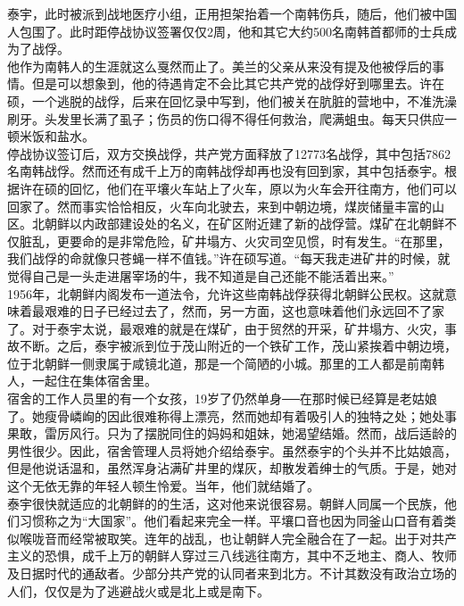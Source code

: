 泰宇，此时被派到战地医疗小组，正用担架抬着一个南韩伤兵，随后，他们被中国人包围了。此时距停战协议签署仅仅2周，他和其它大约500名南韩首都师的士兵成为了战俘。\\

他作为南韩人的生涯就这么戛然而止了。美兰的父亲从来没有提及他被俘后的事情。但是可以想象到，他的待遇肯定不会比其它共产党的战俘好到哪里去。许在硕，一个逃脱的战俘，后来在回忆录中写到，他们被关在肮脏的营地中，不准洗澡刷牙。头发里长满了虱子；伤员的伤口得不得任何救治，爬满蛆虫。每天只供应一顿米饭和盐水。\\

停战协议签订后，双方交换战俘，共产党方面释放了12773名战俘，其中包括7862名南韩战俘。然而还有成千上万的南韩战俘却再也没有回到家，其中包括泰宇。根据许在硕的回忆，他们在平壤火车站上了火车，原以为火车会开往南方，他们可以回家了。然而事实恰恰相反，火车向北驶去，来到中朝边境，煤炭储量丰富的山区。北朝鲜以内政部建设处的名义，在矿区附近建了新的战俘营。煤矿在北朝鲜不仅脏乱，更要命的是非常危险，矿井塌方、火灾司空见惯，时有发生。“在那里，我们战俘的命就像只苍蝇一样不值钱。”许在硕写道。“每天我走进矿井的时候，就觉得自己是一头走进屠宰场的牛，我不知道是自己还能不能活着出来。”\\

1956年，北朝鲜内阁发布一道法令，允许这些南韩战俘获得北朝鲜公民权。这就意味着最艰难的日子已经过去了，然而，另一方面，这也意味着他们永远回不了家了。对于泰宇太说，最艰难的就是在煤矿，由于贸然的开采，矿井塌方、火灾，事故不断。之后，泰宇被派到位于茂山附近的一个铁矿工作，茂山紧挨着中朝边境，位于北朝鲜一侧隶属于咸镜北道，那是一个简陋的小城。那里的工人都是前南韩人，一起住在集体宿舍里。\\

宿舍的工作人员里的有一个女孩，19岁了仍然单身──在那时候已经算是老姑娘了。她瘦骨嶙峋的因此很难称得上漂亮，然而她却有着吸引人的独特之处；她处事果敢，雷厉风行。只为了摆脱同住的妈妈和姐妹，她渴望结婚。然而，战后适龄的男性很少。因此，宿舍管理人员将她介绍给泰宇。虽然泰宇的个头并不比姑娘高，但是他说话温和，虽然浑身沾满矿井里的煤灰，却散发着绅士的气质。于是，她对这个无依无靠的年轻人顿生怜爱。当年，他们就结婚了。\\

泰宇很快就适应的北朝鲜的的生活，这对他来说很容易。朝鲜人同属一个民族，他们习惯称之为“大国家”。他们看起来完全一样。平壤口音也因为同釜山口音有着类似喉咙音而经常被取笑。连年的战乱，也让朝鲜人完全融合在了一起。出于对共产主义的恐惧，成千上万的朝鲜人穿过三八线逃往南方，其中不乏地主、商人、牧师及日据时代的通敌者。少部分共产党的认同者来到北方。不计其数没有政治立场的人们，仅仅是为了逃避战火或是北上或是南下。\\

